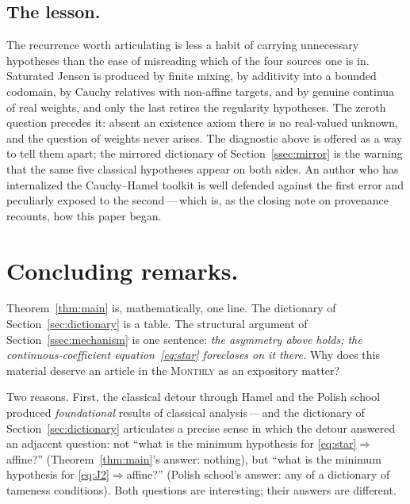 \documentclass{article}
\theoremstyle{plain}
\theoremstyle{definition}
\begin{document}
\subsection{The lesson.}
\label{ssec:lesson}

The recurrence worth articulating is less a habit of carrying unnecessary hypotheses than the ease of misreading which of the
four sources one is in. Saturated Jensen is produced by finite
mixing, by additivity into a bounded codomain, by Cauchy relatives
with non-affine targets, and by genuine continua of real weights,
and only the last retires the regularity hypotheses. The zeroth question
precedes it: absent an existence axiom there is no real-valued
unknown, and the question of weights never arises. The diagnostic
above is offered as a way to tell
them apart; the mirrored dictionary of Section~\ref{ssec:mirror} is
the warning that the same five classical hypotheses appear on both
sides. An author who has internalized the Cauchy--Hamel toolkit is
well defended against the first error and peculiarly exposed to the
second\,---\,which is, as the closing note on provenance recounts,
how this paper began.

\section{Concluding remarks.}
\label{sec:conclusion}

Theorem~\ref{thm:main} is, mathematically, one line. The dictionary of
Section~\ref{sec:dictionary} is a table. The structural
argument of Section~\ref{ssec:mechanism} is one sentence: \emph{the
asymmetry above holds; the continuous-coefficient
equation~\eqref{eq:star} forecloses on it there.} Why does this material
deserve an article in the \textsc{Monthly} as an expository matter?

Two reasons. First, the classical detour through Hamel and the Polish
school produced \emph{foundational} results of classical
analysis\,---\,and the dictionary of Section~\ref{sec:dictionary}
articulates a precise sense in which the detour answered an adjacent
question: not ``what is the minimum hypothesis for
\eqref{eq:star}$\Rightarrow$affine?'' (Theorem~\ref{thm:main}'s
answer: nothing), but ``what is the minimum hypothesis for
\eqref{eq:J2}$\Rightarrow$affine?'' (Polish school's answer: any of a
dictionary of tameness conditions). Both questions are interesting;
their answers are different.
\end{document}
